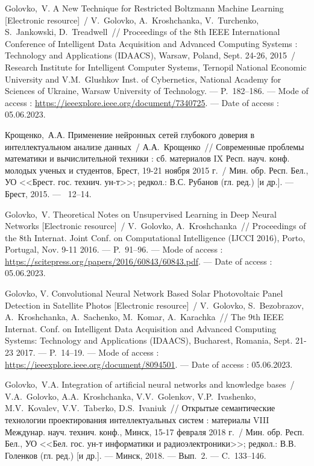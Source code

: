Golovko,~V. A New Technique for Restricted Boltzmann Machine Learning [Electronic resource]~/ V.~Golovko, A.~Kroshchanka, V.~Turchenko, S.~Jankowski, D.~Treadwell~//
\newblock Proceedings of the 8th IEEE International Conference of Intelligent Data Acquisition and Advanced Computing Systems : Technology and Applications (IDAACS), Warsaw, Poland, Sept. 24-26, 2015~/
\newblock Research Institute for Intelligent Computer Systems, Ternopil National Economic University and V.M.~Glushkov Inst. of Cybernetics, National Academy for Sciences of Ukraine, Warsaw University of Technology. ---
\newblock P.~182--186. ---
\newblock Mode of access : \url{https://ieeexplore.ieee.org/document/7340725}. ---
\newblock Date of access : 05.06.2023.

Крощенко,~А.А. Применение нейронных сетей глубокого доверия в интеллектуальном анализе данных~/ А.А.~Крощенко~// 
\newblock Современные проблемы математики и вычислительной техники : сб. материалов IX Респ. науч. конф. молодых ученых и студентов, Брест, 19-21 ноября 2015 г.~/
\newblock Мин. обр. Респ. Бел., УО <<Брест. гос. технич. ун-т>>; редкол.: В.С. Рубанов (гл. ред.) [и др.]. ---
\newblock Брест, 2015. ---
~12--14.

Golovko,~V. Theoretical Notes on Unsupervised Learning in Deep Neural Networks [Electronic resource]~/ V.~Golovko, A.~Kroshchanka~//
\newblock Proceedings of the 8th Internat. Joint Conf. on Computational Intelligence (IJCCI 2016), Porto, Portugal, Nov. 9-11 2016. ---
\newblock P.~91--96. ---
\newblock Mode of access : \url{https://scitepress.org/papers/2016/60843/60843.pdf}. ---
\newblock Date of access : 05.06.2023.

Golovko, V. Convolutional Neural Network Based Solar Photovoltaic Panel Detection in Satellite Photos [Electronic resource]~/ V.~Golovko, S.~Bezobrazov, A.~Kroshchanka, A.~Sachenko, M.~Komar, A.~Karachka~//
\newblock The 9th IEEE Internat. Conf. on Intelligent Data Acquisition and Advanced Computing Systems: Technology and Applications (IDAACS), Bucharest, Romania, Sept. 21-23 2017. ---
\newblock P.~14--19. ---
\newblock Mode of access : \url{https://ieeexplore.ieee.org/document/8094501}. ---
\newblock Date of access : 05.06.2023.

Golovko,~V.A. Integration of artiﬁcial neural networks and knowledge bases~/ V.A.~Golovko, A.A.~Kroshchanka, V.V.~Golenkov, V.P.~Ivashenko, M.V.~Kovalev, V.V.~Taberko, D.S.~Ivaniuk~// 
\newblock Открытые семантические технологии проектирования интеллектуальных систем : материалы VIII Междунар. науч. технич. конф., Минск, 15-17 февраля 2018 г.~/
\newblock Мин. обр. Респ. Бел., УО <<Бел. гос. ун-т информатики и радиоэлектроники>>; редкол.: В.В. Голенков (гл. ред.) [и др.]. ---
\newblock Минск, 2018. ---
\newblock Вып.~2. ---
\newblock C.~133--146.

